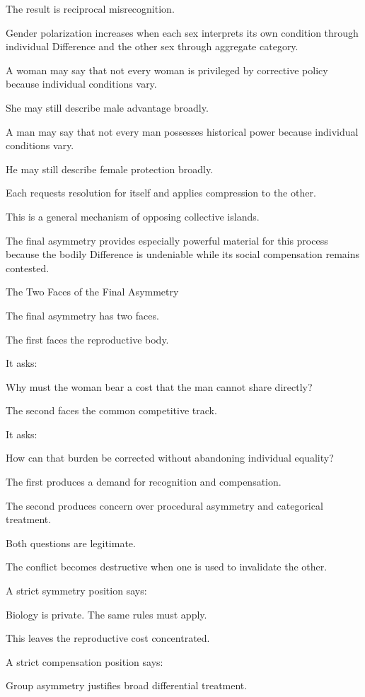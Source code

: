 The result is reciprocal misrecognition.

Gender polarization increases when each sex interprets its own condition through individual Difference and the other sex through aggregate category.

A woman may say that not every woman is privileged by corrective policy because individual conditions vary.

She may still describe male advantage broadly.

A man may say that not every man possesses historical power because individual conditions vary.

He may still describe female protection broadly.

Each requests resolution for itself and applies compression to the other.

This is a general mechanism of opposing collective islands.

The final asymmetry provides especially powerful material for this process because the bodily Difference is undeniable while its social compensation remains contested.

The Two Faces of the Final Asymmetry

The final asymmetry has two faces.

The first faces the reproductive body.

It asks:

Why must the woman bear a cost that the man cannot share directly?

The second faces the common competitive track.

It asks:

How can that burden be corrected without abandoning individual equality?

The first produces a demand for recognition and compensation.

The second produces concern over procedural asymmetry and categorical treatment.

Both questions are legitimate.

The conflict becomes destructive when one is used to invalidate the other.

A strict symmetry position says:

Biology is private. The same rules must apply.

This leaves the reproductive cost concentrated.

A strict compensation position says:

Group asymmetry justifies broad differential treatment.

